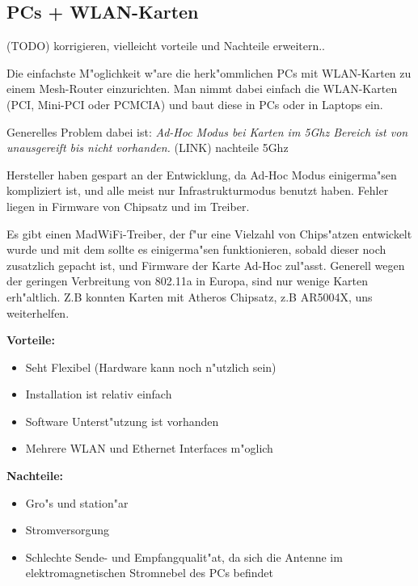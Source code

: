 \subsection{PCs + WLAN-Karten}
(TODO) korrigieren, vielleicht vorteile und Nachteile erweitern..

Die einfachste M"oglichkeit w"are die herk"ommlichen PCs mit WLAN-Karten
zu einem Mesh-Router einzurichten.
Man nimmt dabei einfach die WLAN-Karten (PCI, Mini-PCI oder PCMCIA) und
baut diese in PCs oder in Laptops ein.

Generelles Problem dabei ist: \emph{ Ad-Hoc Modus bei Karten im 5Ghz 
Bereich ist von unausgereift bis nicht vorhanden.} 
(LINK) nachteile 5Ghz

Hersteller haben gespart an der Entwicklung, da Ad-Hoc Modus
einigerma"sen kompliziert ist, und alle meist nur Infrastrukturmodus
benutzt haben. Fehler liegen in Firmware von Chipsatz und im Treiber.

Es gibt einen MadWiFi-Treiber, der f"ur eine Vielzahl von Chips"atzen
entwickelt wurde und mit dem sollte es einigerma"sen funktionieren, sobald
dieser noch zusatzlich gepacht ist, und Firmware der Karte Ad-Hoc zul"asst.
Generell wegen der geringen Verbreitung von 802.11a in Europa, sind
nur wenige Karten erh"altlich. Z.B konnten Karten mit Atheros Chipsatz,
z.B AR5004X, uns weiterhelfen.

\textbf{Vorteile:}

\begin{itemize} 
\item Seht Flexibel (Hardware kann noch n"utzlich sein)
\item Installation ist relativ einfach
\item Software Unterst"utzung ist vorhanden
\item Mehrere WLAN und Ethernet Interfaces m"oglich 
\end{itemize}

\textbf{Nachteile: }
\begin{itemize}
\item Gro"s und station"ar
\item Stromversorgung 
\item Schlechte Sende- und Empfangqualit"at, da sich die Antenne im
elektromagnetischen Stromnebel des PCs befindet
\end{itemize}




